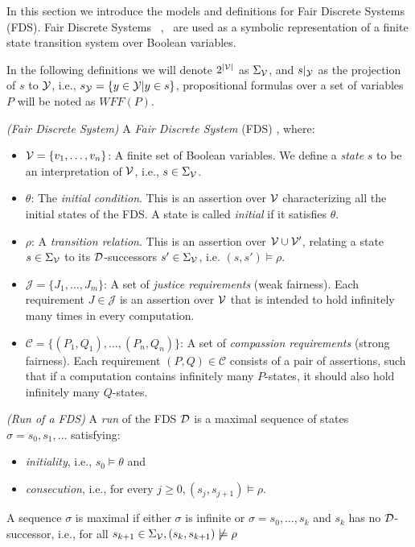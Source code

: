 
In this section we introduce the models and definitions for Fair Discrete Systems (FDS). Fair Discrete Systems ~\cite{kesten2000verification},~\cite{bloem2012synthesis} are used as a symbolic representation of a finite state transition system over Boolean variables. 

In the following definitions we will denote $2^{|{\mathcal{V}}|}$ as $\Sigma_{{\mathcal{V}}}$, and $s|_{{\mathcal{Y}}}$ as the projection of $s$ to ${\mathcal{Y}}$, i.e., $s_{{\mathcal{Y}}} = \{y \in {\ensuremath{\mathcal{Y}}} | y \in s \}$, propositional formulas over a set of variables $P$ will be noted as $WFF(P)$.

\begin{definition}
	\label{def:FDS} \emph{(Fair Discrete System)} 
	A \emph{Fair Discrete System} (FDS) \fdsDef, where:
	\begin{itemize}
		\item ${\mathcal{V}} = \{v_1,\ldots,v_n \}$: A finite set of Boolean variables. We define a \emph{state} $s$ to be an interpretation of ${\mathcal{V}}$, i.e., $s \in \Sigma_{{\mathcal{V}}}$.
		\item $\theta$: The \emph{initial condition}. This is an assertion over ${\mathcal{V}}$ characterizing all the initial states of the FDS. A state is called \emph{initial} if it satisfies $\theta$.
		\item $\rho$: A \emph{transition relation}. This is an assertion over ${\mathcal{V}} \cup {\ensuremath{\mathcal{V}}}'$, relating a state $s \in \Sigma_{{\mathcal{V}}}$ to its $\mathcal{D}$-successors $s' \in \Sigma_{{\mathcal{V}}}$, i.e. $(s,s') \models \rho$.
		\item $\mathcal{J} = \{J_1, \ldots, J_m \}$: A set of \emph{justice requirements} (weak fairness). Each requirement $J \in \mathcal{J}$ is an assertion over ${\mathcal{V}}$ that is intended to hold infinitely many times in every computation.
		\item $\mathcal{C} = \{(P_1,Q_1), \ldots, (P_n,Q_n) \}$: A set of \emph{compassion requirements} (strong fairness). Each requirement $(P,Q) \in \mathcal{C}$ consists of a pair of assertions, such that if a computation contains infinitely many $P$-states, it should also hold infinitely many $Q$-states.
	\end{itemize}
\end{definition}

\begin{definition}
	\label{def:fds_run} \emph{(Run of a FDS)} 
	A \emph{run} of the FDS $\mathcal{D}$ is a maximal sequence of states $\sigma = s_0,s_1,\ldots$
	satisfying:
	\begin{itemize}
		\item \emph{initiality}, i.e., $s_0\models \theta$ and
		\item \emph{consecution}, i.e., for every $j\geq 0, (s_j, s_{j+1})\models \rho$.
	\end{itemize}
	A sequence $\sigma$ is maximal if either $\sigma$ is infinite or $\sigma=s_0,\ldots,s_k$ and $s_k$ has no $\mathcal{D}$-successor, i.e., for all $s_{k+1} \in \Sigma_{{\mathcal{V}}}, (s_k,s_{k+1}) \not\models \rho$
\end{definition}


